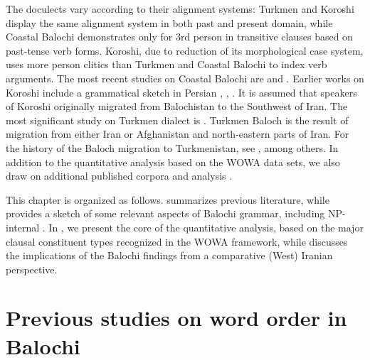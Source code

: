 \documentclass[output=paper,colorlinks,citecolor=brown,draftmode]{langscibook}
\begin{document}
\begin{sloppypar}
The doculects vary according to their alignment systems: Turkmen and Koroshi display the same alignment system in both past and present domain, while Coastal Balochi demonstrates  only for 3rd person in transitive clauses based on past-tense verb forms. Koroshi, due to reduction of its morphological case system, uses more person clitics than Turkmen and Coastal Balochi to index verb arguments. The most recent studies on Coastal Balochi are \citet{nourzaei_participant_2017,nourzaei_documenting_forthcoming} and \citet{korn_notes_2019}. Earlier works on Koroshi include a grammatical sketch in Persian \citep{emadi_guyes-e_2005}, \citet{nourzaei_koroshi_2015}, \citet{nourzaei_participant_2017,nourzaei_documenting_forthcoming}. It is assumed that speakers of Koroshi originally migrated from Balochistan to the Southwest of Iran. The most significant study on Turkmen dialect is \citet{axenov_balochi_2006}. Turkmen Baloch is the result of migration from either Iran or Afghanistan and north-eastern parts of Iran. For the history of the Baloch migration to Turkmenistan, see \citet[71]{axenov_balochi_2000}, among others. In addition to the quantitative analysis based on the WOWA data sets, we also draw on additional published corpora and analysis \citep{barjasteh_delforooz_discourse_2010,nourzaei_koroshi_2015,nourzaei_participant_2017,nourzaei_documenting_forthcoming,axenov_balochi_2006}. 
\end{sloppypar}

This chapter is organized as follows.  summarizes previous literature, while  provides a sketch of some relevant aspects of Balochi grammar, including NP-internal . In , we present the core of the quantitative analysis, based on the major clausal constituent types recognized in the WOWA framework, while  discusses the implications of the Balochi findings from a comparative (West) Iranian perspective.

\section{Previous studies on word order in Balochi}\label{Balochi:ss:2}
\end{document}

